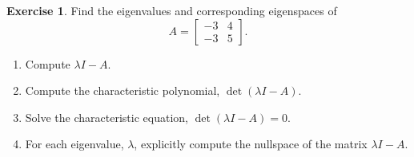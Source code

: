 \documentclass{beamer}
\newcommand{\fn}{\insertframenumber}
\theoremstyle{definition}
\newtheorem{exercise}{Exercise}
\newtheorem*{nb}{Note}
\begin{document}
\begin{frame}{\fn}
	\begin{exercise}
		Find the eigenvalues and corresponding eigenspaces of \[A=\begin{bmatrix}-3&4\\-3&5\end{bmatrix}.\]
		\begin{enumerate}[label=(\alph*)]
			\item Compute $\lambda I-A$.
			\item Compute the characteristic polynomial, $\det(\lambda I-A)$.
			\item Solve the characteristic equation, $\det(\lambda I-A)=0$.
			\item For each eigenvalue, $\lambda$, explicitly compute the nullspace of the matrix $\lambda I-A$.
		\end{enumerate}
	\end{exercise}
\end{frame}
%		
%		
\end{document}
